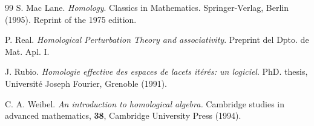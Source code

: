 \begin{thebibliography}{99}
 S. Mac Lane. {\em Homology}. Classics in
Mathematics. Springer-Verlag, Berlin (1995). Reprint of the 1975
edition.


 P. Real. {\em Homological Perturbation Theory and
associativity}. Preprint del Dpto. de Mat. Apl. I.


 J. Rubio. {\em Homologie effective des espaces de
lacets it\'{e}r\'{e}s: un logiciel}. PhD. thesis, Universit\'{e} Joseph
Fourier, Grenoble (1991).

 C. A. Weibel. {\em An introduction to homological
algebra.} Cambridge studies in advanced mathematics, {\bf 38},
Cambridge University Press (1994).





\end{thebibliography}


